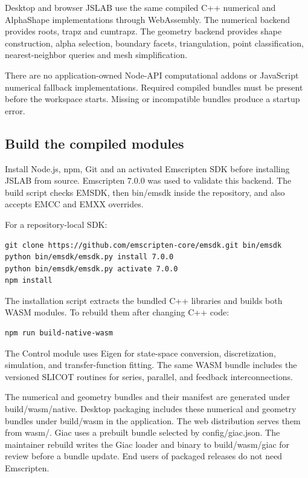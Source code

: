 \documentclass[12pt,a4paper]{article}
\begin{document}
Desktop and browser JSLAB use the same compiled C++ numerical and AlphaShape implementations through WebAssembly. The numerical backend provides roots, trapz and cumtrapz. The geometry backend provides shape construction, alpha selection, boundary facets, triangulation, point classification, nearest-neighbor queries and mesh simplification.

There are no application-owned Node-API computational addons or JavaScript numerical fallback implementations. Required compiled bundles must be present before the workspace starts. Missing or incompatible bundles produce a startup error.


\subsection{Build the compiled modules}

Install Node.js, npm, Git and an activated Emscripten SDK before installing JSLAB from source. Emscripten 7.0.0 was used to validate this backend. The build script checks EMSDK, then bin/emsdk inside the repository, and also accepts EMCC and EMXX overrides.

For a repository-local SDK:

\begin{lstlisting}[style=JavaScriptStyle,language={}]
git clone https://github.com/emscripten-core/emsdk.git bin/emsdk
python bin/emsdk/emsdk.py install 7.0.0
python bin/emsdk/emsdk.py activate 7.0.0
npm install
\end{lstlisting}

The installation script extracts the bundled C++ libraries and builds both WASM modules. To rebuild them after changing C++ code:

\begin{lstlisting}[style=JavaScriptStyle,language={}]
npm run build-native-wasm
\end{lstlisting}

The Control module uses Eigen for state-space conversion, discretization, simulation, and transfer-function fitting. The same WASM bundle includes the versioned SLICOT routines for series, parallel, and feedback interconnections.

The numerical and geometry bundles and their manifest are generated under build/wasm/native. Desktop packaging includes these numerical and geometry bundles under build/wasm in the application. The web distribution serves them from wasm/. Giac uses a prebuilt bundle selected by config/giac.json. The maintainer rebuild writes the Giac loader and binary to build/wasm/giac for review before a bundle update. End users of packaged releases do not need Emscripten.
\end{document}
